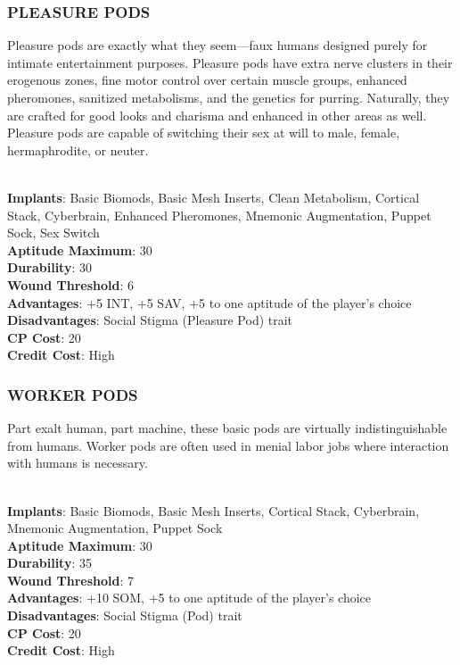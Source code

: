 \subsubsection{PLEASURE PODS}
Pleasure pods are exactly what they seem—faux humans designed purely for
intimate entertainment purposes. Pleasure pods have extra nerve clusters in
their erogenous zones, fine motor control over certain muscle groups, enhanced
pheromones, sanitized metabolisms, and the genetics for purring. Naturally,
they are crafted for good looks and charisma and enhanced in other areas as
well. Pleasure pods are capable of switching their sex at will to male, female,
hermaphrodite, or neuter.

\\ \textbf{Implants}: Basic Biomods, Basic Mesh Inserts, Clean Metabolism, Cortical Stack, Cyberbrain, Enhanced Pheromones, Mnemonic Augmentation, Puppet Sock, Sex Switch
\\ \textbf{Aptitude Maximum}: 30
\\ \textbf{Durability}: 30
\\ \textbf{Wound Threshold}: 6
\\ \textbf{Advantages}: +5 INT, +5 SAV, +5 to one aptitude of the player’s choice
\\ \textbf{Disadvantages}: Social Stigma (Pleasure Pod) trait
\\ \textbf{CP Cost}: 20
\\ \textbf{Credit Cost}: High

\subsubsection{WORKER PODS}
Part exalt human, part machine, these basic pods are virtually
indistinguishable from humans. Worker pods are often used in menial labor jobs
where interaction with humans is necessary.

\\ \textbf{Implants}: Basic Biomods, Basic Mesh Inserts, Cortical Stack, Cyberbrain, Mnemonic Augmentation, Puppet Sock
\\ \textbf{Aptitude Maximum}: 30
\\ \textbf{Durability}: 35
\\ \textbf{Wound Threshold}: 7
\\ \textbf{Advantages}: +10 SOM, +5 to one aptitude of the player’s choice
\\ \textbf{Disadvantages}: Social Stigma (Pod) trait
\\ \textbf{CP Cost}: 20
\\ \textbf{Credit Cost}: High

